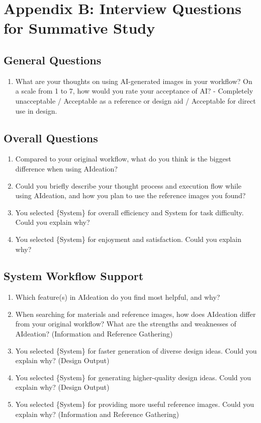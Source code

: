 \section{Appendix B: Interview Questions for Summative Study}
\label{AppendixB}
\subsection*{General Questions}
\begin{enumerate}[label=\textbf{\arabic*.}]
    \item What are your thoughts on using AI-generated images in your workflow? On a scale from 1 to 7, how would you rate your acceptance of AI?  
          - Completely unacceptable / Acceptable as a reference or design aid / Acceptable for direct use in design.
\end{enumerate}

\subsection*{Overall Questions}
\begin{enumerate}[label=\textbf{\arabic*.}]
    \item Compared to your original workflow, what do you think is the biggest difference when using AIdeation? 
    \item Could you briefly describe your thought process and execution flow while using AIdeation, and how you plan to use the reference images you found?
    \item You selected \{System\} for overall efficiency and {System} for task difficulty. Could you explain why? 
    \item You selected \{System\} for enjoyment and satisfaction. Could you explain why? 
\end{enumerate}

\subsection*{System Workflow Support}
\begin{enumerate}[label=\textbf{\arabic*.}]
    \item Which feature(s) in AIdeation do you find most helpful, and why?
    \item When searching for materials and reference images, how does AIdeation differ from your original workflow? What are the strengths and weaknesses of AIdeation? (Information and Reference Gathering)
    \item You selected \{System\} for faster generation of diverse design ideas. Could you explain why? (Design Output)
    \item You selected \{System\} for generating higher-quality design ideas. Could you explain why? (Design Output)
    \item You selected \{System\} for providing more useful reference images. Could you explain why? (Information and Reference Gathering)
\end{enumerate}

